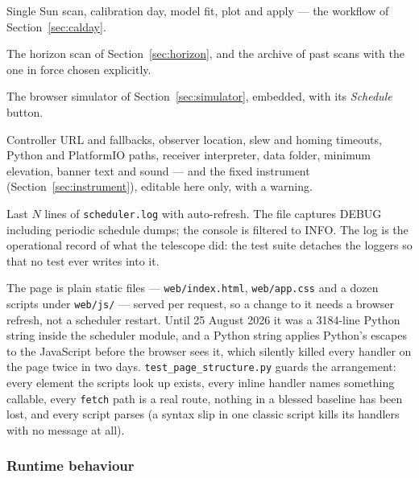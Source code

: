 \documentclass[11pt,a4paper]{article}
\begin{document}
\begin{description}[style=nextline]
    \item[Sun scan tab] Single Sun scan, calibration day, model fit, plot and apply --- the workflow of Section~\ref{sec:calday}.
    \item[Horizon tab] The horizon scan of Section~\ref{sec:horizon}, and the archive of past scans with the one in force chosen explicitly.
    \item[Simulator tab] The browser simulator of Section~\ref{sec:simulator}, embedded, with its \emph{Schedule} button.
    \item[Configuration tab] Controller URL and fallbacks, observer location, slew and homing timeouts, Python and PlatformIO paths, receiver interpreter, data folder, minimum elevation, banner text and sound --- and the fixed instrument (Section~\ref{sec:instrument}), editable here only, with a warning.
    \item[Log tab] Last $N$ lines of \texttt{scheduler.log} with auto-refresh. The file captures DEBUG including periodic schedule dumps; the console is filtered to INFO. The log is the operational record of what the telescope did: the test suite detaches the loggers so that no test ever writes into it.
\end{description}

The page is plain static files --- \texttt{web/index.html}, \texttt{web/app.css} and a dozen scripts under \texttt{web/js/} --- served per request, so a change to it needs a browser refresh, not a scheduler restart. Until 25 August 2026 it was a 3184-line Python string inside the scheduler module, and a Python string applies Python's escapes to the JavaScript before the browser sees it, which silently killed every handler on the page twice in two days. \texttt{test\_page\_structure.py} guards the arrangement: every element the scripts look up exists, every inline handler names something callable, every \texttt{fetch} path is a real route, nothing in a blessed baseline has been lost, and every script parses (a syntax slip in one classic script kills its handlers with no message at all).

\subsubsection{Runtime behaviour}
\end{document}
